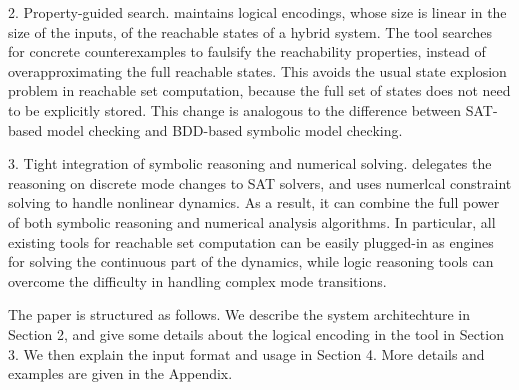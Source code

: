 2. Property-guided search. \dReach{} maintains logical encodings, whose size is linear in the size of the inputs, of the reachable states of
a hybrid system. The tool searches for concrete counterexamples to faulsify the reachability properties, instead of overapproximating the full reachable states. 
This avoids the usual state explosion problem in reachable set computation, because the full set of states does not need to be explicitly stored. This change
is analogous to the difference between SAT-based model checking and BDD-based symbolic model checking.

3. Tight integration of symbolic reasoning and numerical solving. \dReach{} delegates the
reasoning on discrete mode changes to SAT solvers, and uses numerlcal constraint solving to handle nonlinear dynamics.
As a result, it can combine the full power of both symbolic reasoning and numerical analysis algorithms. In particular,
all existing tools for reachable set computation can be easily plugged-in as engines for solving
the continuous part of the dynamics, while logic reasoning tools can overcome the difficulty 
in handling complex mode transitions.

The paper is structured as follows. We describe the system architechture in Section 2, 
and give some details about the logical encoding in the tool in Section 3. 
We then explain the input format and usage in Section 4. More details and examples are given in the Appendix. 




\newpage
